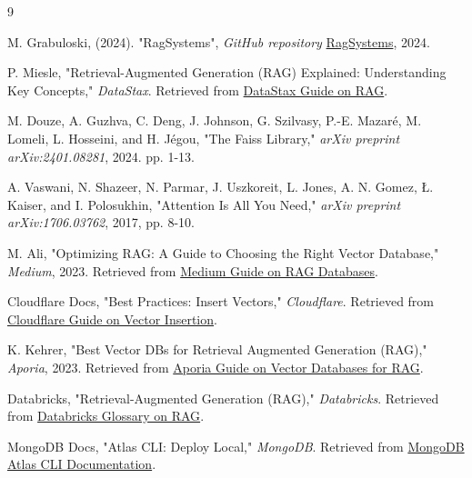 \documentclass{wseas}
\begin{document}
\begin{thebibliography}{9}

   M. Grabuloski, (2024). "RagSystems", \textit{GitHub repository} \href{https://github.com/mgrabul/RagSystems}{RagSystems}, 2024.

   P. Miesle, "Retrieval-Augmented Generation (RAG) Explained: Understanding Key Concepts," \textit{DataStax}. Retrieved from \href{https://www.datastax.com/guides/what-is-retrieval-augmented-generation}{DataStax Guide on RAG}.
  
   M. Douze, A. Guzhva, C. Deng, J. Johnson, G. Szilvasy, P.-E. Mazaré, M. Lomeli, L. Hosseini, and H. Jégou, "The Faiss Library," \textit{arXiv preprint arXiv:2401.08281}, 2024. pp. 1-13.

   A. Vaswani, N. Shazeer, N. Parmar, J. Uszkoreit, L. Jones, A. N. Gomez, Ł. Kaiser, and I. Polosukhin, "Attention Is All You Need," \textit{arXiv preprint arXiv:1706.03762}, 2017, pp. 8-10.

   M. Ali, "Optimizing RAG: A Guide to Choosing the Right Vector Database," \textit{Medium}, 2023. Retrieved from \href{https://medium.com/@mutahar789/optimizing-rag-a-guide-to-choosing-the-right-vector-database-480f71a33139}{Medium Guide on RAG Databases}.
  
  Cloudflare Docs, "Best Practices: Insert Vectors," \textit{Cloudflare}. Retrieved from \href{https://developers.cloudflare.com/vectorize/best-practices/insert-vectors/}{Cloudflare Guide on Vector Insertion}.
  
   K. Kehrer, "Best Vector DBs for Retrieval Augmented Generation (RAG)," \textit{Aporia}, 2023. Retrieved from \href{https://www.aporia.com/learn/best-vector-dbs-for-retrieval-augmented-generation-rag/}{Aporia Guide on Vector Databases for RAG}.
  
   Databricks, "Retrieval-Augmented Generation (RAG)," \textit{Databricks}. Retrieved from \href{https://www.databricks.com/glossary/retrieval-augmented-generation-rag}{Databricks Glossary on RAG}.
  
  MongoDB Docs, "Atlas CLI: Deploy Local," \textit{MongoDB}. Retrieved from \href{https://www.mongodb.com/docs/atlas/cli/current/atlas-cli-deploy-local/}{MongoDB Atlas CLI Documentation}.
  

\end{thebibliography}
\end{document}
